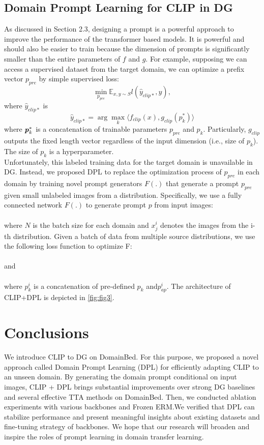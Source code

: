 \documentclass[11pt,twocolumn]{article}
\begin{document}
\subsection{Domain Prompt Learning for CLIP in DG}
As discussed in Section 2.3, designing a prompt is a powerful approach to improve the performance of the transformer based models. It is powerful and should also be easier to train because the dimension of prompts is significantly smaller than the entire parameters of $f$ and $g$. For example, supposing we can access a supervised dataset from the target domain, we can optimize a prefix vector $p_{pre}$ by simple supervised loss:
\begin{equation}
    \min_{p_{pre}} \mathbb{E}_{x,y\sim S}l(\hat{y}_{clip*},y),
\end{equation}
where $\hat{y}_{clip*}$ is
\begin{equation}
    \hat{y}_{clip*} = \arg \max_k \langle f_{clip}(x),g_{clip}(p_k^*)\rangle
\end{equation}
where $\textbf{\textit{p}}_k^*$ is a concatenation of trainable parameters $p_{pre}$ and $p_k$. Particularly, $g_{clip}$ outputs the fixed length vector regardless of the input dimension (i.e., size of $p_k$). The size of $p_k$ is a hyperparameter.\\
\hspace{1cm}
Unfortunately, this labeled training data for the target domain is unavailable in DG. Instead, we proposed DPL to replace the optimization process of $p_{pre}$ in each domain by training novel prompt generators $F(.)$ that generate a prompt $p_{pre}$ given small unlabeled images from a distribution. Specifically, we use a fully connected network $F(.)$ to generate prompt $p$ from input images:\\
\\
where $N$ is the batch size for each domain and $x_j^i$ denotes the images from the i-th distribution. Given a batch of data from multiple source distributions, we use the following loss function to optimize F:\\
\\
and \\
\\
where $p_k^i$ is a concatenation of pre-defined $p_k$ and$p_{ap}^i$.  The architecture of CLIP+DPL is depicted in \autoref{fig:fig3}.

\section{Conclusions}
We introduce CLIP to DG on DomainBed. For this purpose, we proposed a novel approach called Domain Prompt Learning (DPL) for efficiently adapting CLIP to an unseen domain. By generating the domain prompt conditional on input images, CLIP + DPL brings substantial improvements over strong DG baselines and several effective TTA methods on DomainBed. Then, we conducted ablation experiments with various backbones and Frozen ERM.We verified that DPL can stabilize performance and present meaningful insights about existing datasets and fine-tuning strategy of backbones. We hope that our research will broaden and inspire the roles of prompt learning in domain transfer learning.
\end{document}

